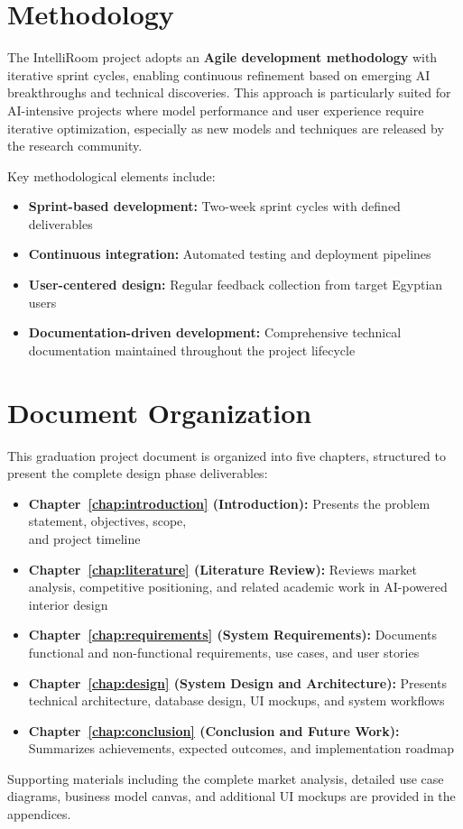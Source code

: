 \section{Methodology}
\label{sec:methodology}

The IntelliRoom project adopts an \textbf{Agile development methodology} with iterative sprint cycles, enabling continuous refinement based on emerging AI breakthroughs and technical discoveries. This approach is particularly suited for AI-intensive projects where model performance and user experience require iterative optimization, especially as new models and techniques are released by the research community.

Key methodological elements include:

\begin{itemize}
    \item \textbf{Sprint-based development:} Two-week sprint cycles with defined deliverables
    \item \textbf{Continuous integration:} Automated testing and deployment pipelines
    \item \textbf{User-centered design:} Regular feedback collection from target Egyptian users
    \item \textbf{Documentation-driven development:} Comprehensive technical documentation maintained throughout the project lifecycle
\end{itemize}

\section{Document Organization}
\label{sec:organization}

This graduation project document is organized into five chapters, structured to present the complete design phase deliverables:

\begin{itemize}
    \item \textbf{Chapter~\ref{chap:introduction} (Introduction):} Presents the problem statement, objectives, scope,\\ and project timeline
    
    \item \textbf{Chapter~\ref{chap:literature} (Literature Review):} Reviews market analysis, competitive positioning, and related academic work in AI-powered interior design
    
    \item \textbf{Chapter~\ref{chap:requirements} (System Requirements):} Documents functional and non-functional requirements, use cases, and user stories
    
    \item \textbf{Chapter~\ref{chap:design} (System Design and Architecture):} Presents technical architecture, database design, UI mockups, and system workflows
    
    \item \textbf{Chapter~\ref{chap:conclusion} (Conclusion and Future Work):} Summarizes achievements, expected outcomes, and implementation roadmap
\end{itemize}

Supporting materials including the complete market analysis, detailed use case diagrams, business model canvas, and additional UI mockups are provided in the appendices.
